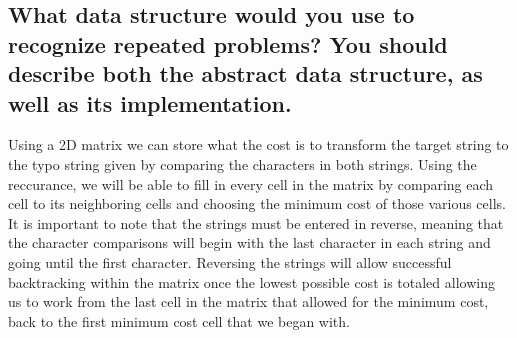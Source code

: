 \documentclass[letterpaper,12pt]{article}
\begin{document}
\subsection{What data structure would you use to recognize repeated problems? You should describe both the abstract data structure, as well as its implementation.}
Using a 2D matrix we can store what the cost is to transform the target string to the typo string given by comparing the characters in both strings. Using the reccurance, we will be able to fill in every cell in the matrix by comparing each cell to its neighboring cells and choosing the minimum cost of those various cells. It is important to note that the strings must be entered in reverse, meaning that the character comparisons will begin with the last character in each string and going until the first character. Reversing the strings will allow successful backtracking within the matrix once the lowest possible cost is totaled allowing us to work from the last cell in the matrix that allowed for the minimum cost, back to the first minimum cost cell that we began with.  
\end{document}
